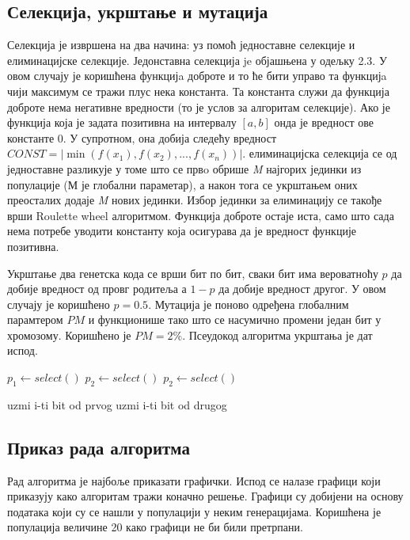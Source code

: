 \documentclass{article}
\begin{document}
\subsection{Селекција, укрштање и мутација}
Селекција је извршена на два начина: уз помоћ једноставне селекције и елиминацијске селекције.
Једонставна селекција je објашњена у одељку 2.3. У овом случају је коришћена функцијa доброте и то ће бити управо 
та функцијa чији максимум се тражи плус нека константа. Та константа служи да функција доброте
нема негативне вредности (то је услов за алгоритам селекције). 
Ако је функција која је задата позитивна на интервалу $[a, b]$ онда је вредност 
ове константе 0. У супротном, она добија следећу вредност $CONST = |\min(f(x_1), f(x_2), ..., f(x_n))|$.
елиминацијска селекција се од једноставне разликује у томе што се првo
обрише \textit{M} најгорих јединки из популације (М је глобални параметар), а након тога се укрштањем оних преосталих додаје
\textit{M} нових јединки. Избор јединки за елиминацију се такође врши Roulette wheel алгоритмом.
Функција доброте остаје иста, само што сада нема потребе уводити константу која осигурава да је вредност функције позитивна.

Укрштање два генетска кода се врши бит по бит, сваки бит има вероватноћу  $p$
да добије вредност од провг родитеља а $1 - p$ да добије вредност другог. У овом
случају је коришћено $p = 0.5$. Мутација је поново одређена глобалним парамтером $PM$ 
и функционише тако што се насумично промени један бит у хромозому. Коришћено је 
$PM = 2\%$. Псеудокод алгоритма укрштања је дат испод.
\newline
\begin{algorithmic}
    \State $p_1 \gets select()$
    \State $p_2 \gets select()$
        \State $p_2 \gets select()$
    \EndWhile
    
            \State uzmi i-ti bit od prvog 
        \Else
            \State uzmi i-ti bit od drugog
        \EndIf
    \EndFor
\end{algorithmic}

\subsection{Приказ рада алгоритма}
Рад алгоритма је најбоље приказати графички. Испод се налазе графици који приказују како алгоритам 
тражи коначно решење. Графици су добијени на основу података који су се нашли у популацији у неким 
генерацијама. Коришћена је популација величине 20 како графици не би били претрпани.
\end{document}
